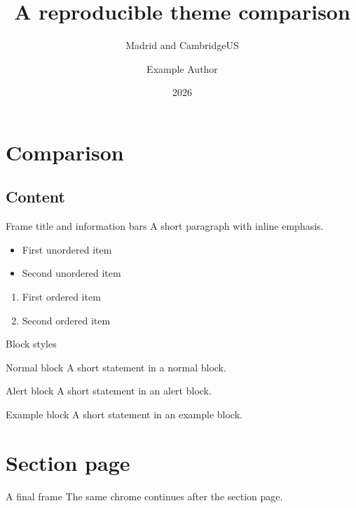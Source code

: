 \listfiles
\usepackage[T1]{fontenc}
\title[Reference comparison]{A reproducible theme comparison}
\subtitle{Madrid and CambridgeUS}
\author[Example Author]{Example Author}
\date[2026]{2026}

\begin{frame}
  \titlepage
\end{frame}
\section{Comparison}
\subsection{Content}
\begin{frame}{Frame title and information bars}
  A short paragraph with \alert{inline emphasis}.
  \begin{itemize}
    \item First unordered item
    \item Second unordered item
  \end{itemize}
  \begin{enumerate}
    \item First ordered item
    \item Second ordered item
  \end{enumerate}
\end{frame}
\begin{frame}{Block styles}
  \begin{block}{Normal block}
    A short statement in a normal block.
  \end{block}
  \begin{alertblock}{Alert block}
    A short statement in an alert block.
  \end{alertblock}
  \begin{exampleblock}{Example block}
    A short statement in an example block.
  \end{exampleblock}
\end{frame}
\section{Section page}
\begin{frame}
  \sectionpage
\end{frame}
\begin{frame}{A final frame}
  The same chrome continues after the section page.
\end{frame}

